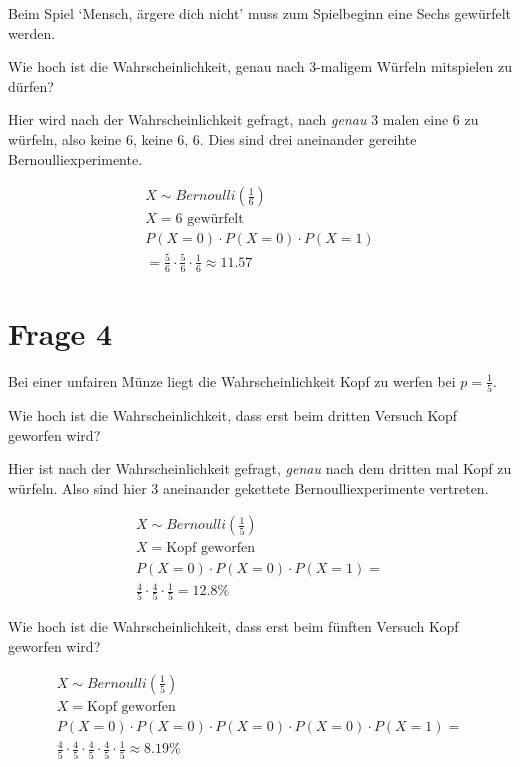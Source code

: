 Beim Spiel `Mensch, ärgere dich nicht' muss zum Spielbeginn eine Sechs gewürfelt werden.

Wie hoch ist die Wahrscheinlichkeit, genau nach 3-maligem Würfeln mitspielen zu dürfen?

Hier wird nach der Wahrscheinlichkeit gefragt, nach \textit{genau} 3 malen eine 6 zu würfeln, also keine 6, keine 6, 6. Dies sind drei aneinander gereihte Bernoulliexperimente. 

\begin{align*}
    X \sim Bernoulli(\frac{1}{6}) \\
    X = \text{6 gewürfelt} \\
    P(X = 0) \cdot P(X = 0) \cdot P(X = 1) \\
    = \frac{5}{6} \cdot \frac{5}{6} \cdot \frac{1}{6} \approx 11.57
\end{align*}

\pagebreak

\section{Frage 4}

Bei einer unfairen Münze liegt die Wahrscheinlichkeit Kopf zu werfen bei $p = \frac{1}{5}$.

Wie hoch ist die Wahrscheinlichkeit, dass erst beim dritten Versuch Kopf geworfen wird?

Hier ist nach der Wahrscheinlichkeit gefragt, \textit{genau} nach dem dritten mal Kopf zu würfeln. Also sind hier 3 aneinander gekettete Bernoulliexperimente vertreten.

\begin{align*}
    X \sim Bernoulli(\frac{1}{5}) \\
    X = \text{Kopf geworfen} \\
    P(X = 0) \cdot P(X = 0) \cdot P(X = 1) = \\
    \frac{4}{5} \cdot \frac{4}{5} \cdot \frac{1}{5} = 12.8\%
\end{align*}

Wie hoch ist die Wahrscheinlichkeit, dass erst beim fünften Versuch Kopf geworfen wird?

\begin{align*}
    X \sim Bernoulli(\frac{1}{5}) \\
    X = \text{Kopf geworfen} \\
    P(X = 0) \cdot P(X = 0) \cdot P(X = 0) \cdot P(X = 0) \cdot P(X = 1) = \\
    \frac{4}{5} \cdot \frac{4}{5} \cdot \frac{4}{5} \cdot \frac{4}{5} \cdot \frac{1}{5} \approx 8.19\%
\end{align*}

